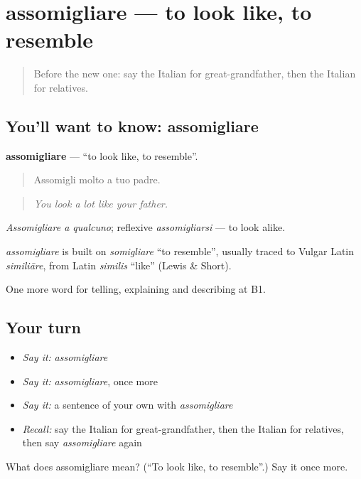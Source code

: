 \section[assomigliare]{assomigliare — to look like, to resemble}

\label{lesson:IT-C493-assomigliare}



\begin{quote}
Before the new one: say the Italian for great-grandfather, then the Italian for relatives.
\end{quote}

\subsection*{You'll want to know: assomigliare}
\textbf{assomigliare} — \textquotedblleft{}to look like, to resemble\textquotedblright{}.

\begin{quote}
Assomigli molto a tuo padre.
\end{quote}

\begin{quote}
\emph{You look a lot like your father.}
\end{quote}

\emph{Assomigliare a qualcuno}; reflexive \emph{assomigliarsi} — to look alike.

\begin{cousinweb}
\emph{assomigliare} is built on \emph{somigliare} \textquotedblleft{}to resemble\textquotedblright{}, usually traced to Vulgar Latin \emph{similiāre}, from Latin \emph{similis} \textquotedblleft{}like\textquotedblright{} (Lewis \& Short).
\end{cousinweb}

\begin{grammarlens}[title={What you've built}]
One more word for telling, explaining and describing at B1.
\end{grammarlens}

\subsection*{Your turn}
\begin{itemize}
\raggedright
  \item \emph{Say it:} \emph{assomigliare}
  \item \emph{Say it:} \emph{assomigliare}, once more
  \item \emph{Say it:} a sentence of your own with \emph{assomigliare}
  \item \emph{Recall:} say the Italian for great-grandfather, then the Italian for relatives, then say \emph{assomigliare} again
\end{itemize}

\begin{tcolorbox}[breakable,colback=teal!4,colframe=teal!35!black,title={Before you move on}]
What does assomigliare mean? (\textquotedblleft{}To look like, to resemble\textquotedblright{}.) Say it once more.
\end{tcolorbox}
